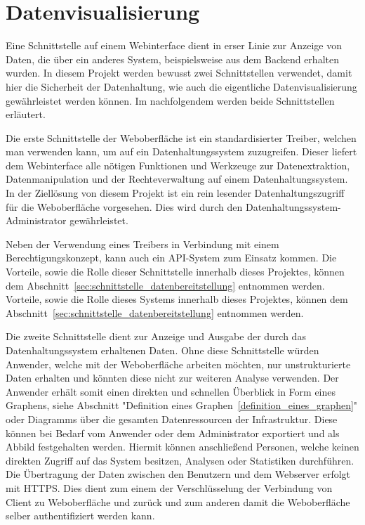 {\section{Datenvisualisierung}
Eine Schnittstelle auf einem Webinterface dient in erser Linie zur Anzeige von
Daten, die über ein anderes System, beispielsweise aus dem Backend erhalten
wurden. In diesem Projekt werden bewusst zwei Schnittstellen verwendet, damit
hier die Sicherheit der Datenhaltung, wie auch die eigentliche
Datenvisualisierung gewährleistet werden können. Im nachfolgendem werden beide
Schnittstellen erläutert.

Die erste Schnittstelle der Weboberfläche ist ein standardisierter Treiber,
welchen man verwenden kann, um auf ein Datenhaltungssystem zuzugreifen. Dieser
liefert dem Webinterface alle nötigen Funktionen und Werkzeuge zur
Datenextraktion, Datenmanipulation und der Rechteverwaltung auf einem
Datenhaltungssystem. In der Ziellösung von diesem Projekt ist ein rein lesender
Datenhaltungszugriff für die Weboberfläche vorgesehen. Dies wird durch den
Datenhaltungssystem\hyp{}Administrator gewährleistet.

Neben der Verwendung eines Treibers in Verbindung mit einem
Berechtigungskonzept, kann auch ein API\hyp{}System zum Einsatz kommen. Die
Vorteile, sowie die Rolle dieser Schnittstelle innerhalb dieses Projektes,
können dem Abschnitt~\ref{sec:schnittstelle_datenbereitstellung} entnommen
werden.
Vorteile, sowie die Rolle dieses Systems innerhalb dieses Projektes, können dem
Abschnitt~\ref{sec:schnittstelle_datenbereitstellung} entnommen werden.

Die zweite Schnittstelle dient zur Anzeige und Ausgabe der durch das
Datenhaltungssystem erhaltenen Daten. Ohne diese Schnittstelle würden Anwender,
welche mit der Weboberfläche arbeiten möchten, nur unstrukturierte Daten
erhalten und könnten diese nicht zur weiteren Analyse verwenden. Der Anwender
erhält somit einen direkten und schnellen Überblick in Form eines Graphens,
siehe Abschnitt "Definition eines Graphen~\ref{definition_eines_graphen}" oder
Diagramms über die gesamten Datenressourcen der Infrastruktur. Diese können bei
Bedarf vom Anwender oder dem Administrator exportiert und als Abbild
festgehalten werden. Hiermit können anschließend Personen, welche keinen
direkten Zugriff auf das System besitzen, Analysen oder Statistiken
durchführen. Die Übertragung der Daten zwischen den Benutzern und dem Webserver
erfolgt mit \gls{HTTPS}. Dies dient zum einem der Verschlüsselung der
Verbindung von Client zu Weboberfläche und zurück und zum anderen damit die
Weboberfläche selber authentifiziert werden kann.
\mr%

}

